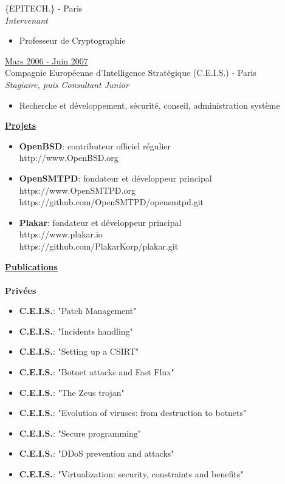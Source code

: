\documentclass[a4paper,10pt]{letter}
\begin{document}
\begin{description}
  \{EPITECH.\} - Paris\\
  \textit{Intervenant}
  \begin{itemize}
  \item Professeur de Cryptographie\\
  \end{itemize}

\item{\underline{Mars 2006 - Juin 2007}} \\
  Compagnie Europ\'eenne d'Intelligence Strat\'egique (C.E.I.S.) - Paris\\
  \textit{Stagiaire, puis Consultant Junior}
  \begin{itemize}
  \item Recherche et d\'eveloppement, s\'ecurit\'e, conseil, administration syst\`eme\\
  \end{itemize}
\end{description}

\pagebreak

\underline{\textbf{Projets}}\\
\begin{itemize}
\item	\textbf{OpenBSD}: contributeur officiel r\'egulier\\
  http://www.OpenBSD.org\\
\item	\textbf{OpenSMTPD}: fondateur et d\'eveloppeur principal\\
  https://www.OpenSMTPD.org\\
  https://github.com/OpenSMTPD/opensmtpd.git\\
\item	\textbf{Plakar}: fondateur et d\'eveloppeur principal\\
  https://www.plakar.io\\
  https://github.com/PlakarKorp/plakar.git\\
\end{itemize}

\underline{\textbf{Publications}}\\
\\
\textbf{Priv\'ees}
\begin{itemize}
\item	\textbf{C.E.I.S.}: "Patch Management"
\item	\textbf{C.E.I.S.}: "Incidents handling"
\item	\textbf{C.E.I.S.}: "Setting up a CSIRT"
\item	\textbf{C.E.I.S.}: "Botnet attacks and Fast Flux"
\item	\textbf{C.E.I.S.}: "The Zeus trojan"
\item	\textbf{C.E.I.S.}: "Evolution of viruses: from destruction to botnets"
\item	\textbf{C.E.I.S.}: "Secure programming"
\item	\textbf{C.E.I.S.}: "DDoS prevention and attacks"
\item	\textbf{C.E.I.S.}: "Virtualization: security, constraints and benefits"\\
\end{itemize}
\end{document}
